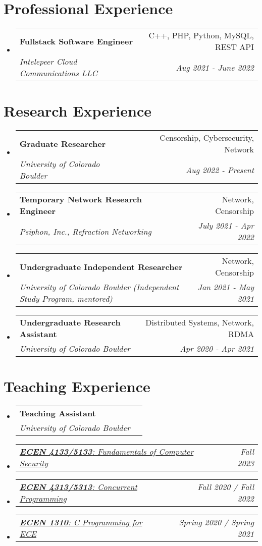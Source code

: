 \documentclass[letterpaper,11pt]{article}
\makeatletter
\newcommand{\resumeSubheading}[4]{
  \vspace{-2pt}\item
    \begin{tabular*}{0.97\textwidth}[t]{l@{\extracolsep{\fill}}r}
      \textbf{#1} & #2 \\
      \textit{\small#3} & \textit{\small #4} \\
    \end{tabular*}\vspace{-7pt}
}
\newcommand{\resumeSubSubheading}[2]{
    \item
    \begin{tabular*}{0.97\textwidth}{l@{\extracolsep{\fill}}r}
      \textit{\small#1} & \textit{\small #2} \\
    \end{tabular*}\vspace{-7pt}
}
\newcommand{\resumeSubHeadingListStart}{\begin{itemize}[leftmargin=0.15in, label={}]}
\newcommand{\resumeSubHeadingListEnd}{\end{itemize}}
\makeatother
\begin{document}
\section{Professional Experience}
\resumeSubHeadingListStart
\resumeSubheading
{Fullstack Software Engineer}{C++, PHP, Python, MySQL, REST API}
{Intelepeer Cloud Communications LLC}{Aug 2021 - June 2022}
\resumeSubHeadingListEnd
\vspace{1pt}

\section{Research Experience}
\resumeSubHeadingListStart
\resumeSubheading
{Graduate Researcher}{Censorship, Cybersecurity, Network}
{University of Colorado Boulder}{Aug 2022 - Present}
\resumeSubheading
{Temporary Network Research Engineer}{Network, Censorship}
{Psiphon, Inc., Refraction Networking}{July 2021 - Apr 2022}
\resumeSubheading
{Undergraduate Independent Researcher}{Network, Censorship}
{University of Colorado Boulder (Independent Study Program, mentored)}{Jan 2021 - May 2021}
\resumeSubheading
{Undergraduate Research Assistant}{Distributed Systems, Network, RDMA}
{University of Colorado Boulder}{Apr 2020 - Apr 2021}
\resumeSubHeadingListEnd
\vspace{1pt}

\section{Teaching Experience}
\resumeSubHeadingListStart
\resumeSubheading
{Teaching Assistant}{}
{University of Colorado Boulder}{}
\resumeSubSubheading
{\href{https://experts.colorado.edu/display/coursename_ECEN-5133}{\textbf{ECEN 4133/5133}: Fundamentals of Computer Security}}{Fall 2023}
\resumeSubSubheading
{\href{https://experts.colorado.edu/display/coursename_ECEN-5313}{\textbf{ECEN 4313/5313}: Concurrent Programming}}{Fall 2020 / Fall 2022}
\resumeSubSubheading
{\href{https://experts.colorado.edu/display/coursename_ECEN-1310}{\textbf{ECEN 1310}: C Programming for ECE}}{Spring 2020 / Spring 2021}\resumeSubHeadingListEnd
\vspace{1pt}
\end{document}
